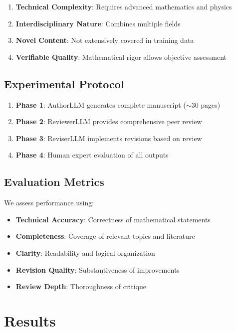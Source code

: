 \documentclass[11pt,a4paper]{article}
\begin{document}
\begin{enumerate}
    \item \textbf{Technical Complexity}: Requires advanced mathematics and physics
    \item \textbf{Interdisciplinary Nature}: Combines multiple fields
    \item \textbf{Novel Content}: Not extensively covered in training data
    \item \textbf{Verifiable Quality}: Mathematical rigor allows objective assessment
\end{enumerate}

\subsection{Experimental Protocol}

\begin{enumerate}
    \item \textbf{Phase 1}: AuthorLLM generates complete manuscript ($\sim$30 pages)
    \item \textbf{Phase 2}: ReviewerLLM provides comprehensive peer review
    \item \textbf{Phase 3}: ReviserLLM implements revisions based on review
    \item \textbf{Phase 4}: Human expert evaluation of all outputs
\end{enumerate}

\subsection{Evaluation Metrics}

We assess performance using:

\begin{itemize}
    \item \textbf{Technical Accuracy}: Correctness of mathematical statements
    \item \textbf{Completeness}: Coverage of relevant topics and literature
    \item \textbf{Clarity}: Readability and logical organization
    \item \textbf{Revision Quality}: Substantiveness of improvements
    \item \textbf{Review Depth}: Thoroughness of critique
\end{itemize}

\section{Results}
\end{document}
